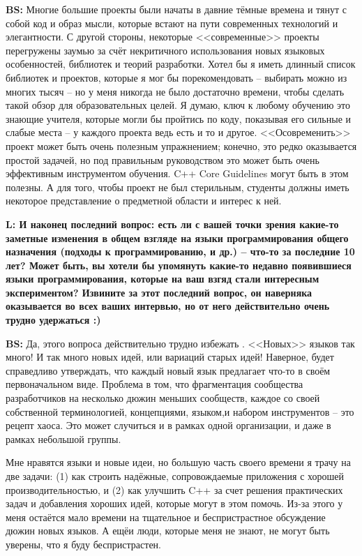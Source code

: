 \documentclass[10pt, a5paper]{article}
\begin{document}
\begin{Parallel}[p]{}{}
{{\noindent \bf BS:} Многие большие проекты были начаты в давние тёмные времена и тянут с собой код и образ мысли, которые встают на пути современных технологий и элегантности. С другой стороны, некоторые <<современные>> проекты перегружены заумью за счёт некритичного использования новых языковых особенностей, библиотек и теорий разработки. Хотел бы я иметь длинный список библиотек и проектов, которые я мог бы порекомендовать – выбирать можно из многих тысяч – но у меня никогда не было достаточно времени, чтобы сделать такой обзор для образовательных целей. Я думаю, ключ к любому обучению это знающие учителя, которые могли бы пройтись по коду, показывая его сильные и слабые места – у каждого проекта ведь есть и то и другое. <<Осовременить>> проект может быть очень полезным упражнением; конечно, это редко оказывается простой задачей, но под правильным руководством это может быть очень эффективным инструментом обучения. C++ Core Guidelines могут быть в этом полезны. А для того, чтобы проект не был стерильным, студенты должны иметь некоторое представление о предметной области и интерес к ней.

{\noindent \bf L: И наконец последний вопрос: есть ли с вашей точки зрения какие-то заметные изменения в общем взгляде на языки программирования общего назначения (подходы к программированию, и др.) -- что-то за последние 10 лет? Может быть, вы хотели бы упомянуть какие-то недавно появившиеся языки программирования, которые на ваш взгяд стали интересным экспериментом? Извините за этот последний вопрос, он наверняка оказывается во всех ваших интервью, но от него действительно очень трудно удержаться :) }

{\noindent \bf BS:} Да, этого вопроса действительно трудно избежать \Smiley{}. <<Новых>> языков так много! И так много новых идей, или вариаций старых идей! Наверное, будет справедливо утверждать, что каждый новый язык предлагает что-то в своём первоначальном виде. Проблема в том, что фрагментация сообщества разработчиков на несколько дюжин меньших сообществ, каждое со своей собственной терминологией, концепциями, языком,и набором инструментов -- это рецепт хаоса. Это может случиться и в рамках одной организации, и даже в рамках небольшой группы.

Мне нравятся языки и новые идеи, но большую часть своего времени я трачу на две задачи: (1) как строить надёжные, сопровождаемые приложения с хорошей производительностью, и (2) как улучшить C++ за счет решения практических задач и добавления хороших идей, которые могут в этом помочь. Из-за этого у меня остаётся мало времени на тщательное и беспристрастное обсуждение дюжин новых языков. А ещёи люди, которые меня не знают, не могут быть уверены, что я буду беспристрастен.

}
\end{Parallel}
\end{document}
